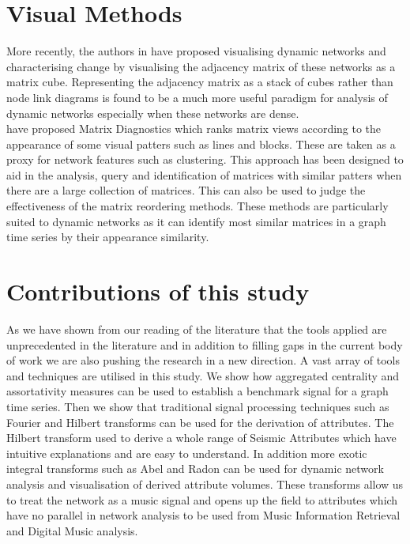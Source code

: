 \section{Visual Methods}

More recently, the authors in \citeauthor{Behrisch2016}\cite{Behrisch2016} have proposed visualising dynamic networks and
characterising change by visualising the adjacency matrix of these networks as a matrix cube. Representing the adjacency matrix as a stack of cubes rather than node link diagrams is found to be a much more useful paradigm for analysis of dynamic networks especially when these networks are dense.\\

\citeauthor{Behrisch2016b}\cite{Behrisch2016b} have proposed Matrix Diagnostics which ranks matrix views according to the appearance of some visual patters such as lines and blocks. These are taken as a proxy for network features such as clustering. This approach has been designed to aid in the analysis, query and identification of matrices with similar patters when there are a large collection of matrices. This can also be used to judge the effectiveness of the matrix reordering methods. These methods are particularly suited to dynamic networks as it can identify most similar matrices in a graph time series by their appearance similarity. 


\section{Contributions of this study}

As we have shown from our reading of the literature that the tools applied are unprecedented in the literature and in addition to filling gaps in the current body of work we are also pushing the research in a new direction. A vast array of tools and techniques are utilised in this study. We show how aggregated centrality and assortativity measures can be used to establish a benchmark signal for a graph time series. Then we show that traditional signal processing techniques such as Fourier and Hilbert transforms can be used for the derivation of attributes. The Hilbert transform used to derive a whole range of Seismic Attributes which have intuitive explanations and are easy to understand. In addition more exotic integral transforms such as Abel and Radon can be used for dynamic network analysis and visualisation of derived attribute volumes. These transforms allow us to treat the network as a music signal and opens up the field to attributes which have no parallel in network analysis to be used from Music Information Retrieval and Digital Music analysis. \\

